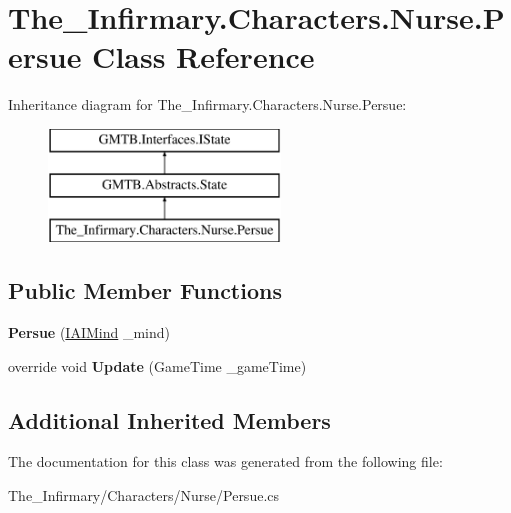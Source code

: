 \hypertarget{class_the___infirmary_1_1_characters_1_1_nurse_1_1_persue}{}\section{The\+\_\+\+Infirmary.\+Characters.\+Nurse.\+Persue Class Reference}
\label{class_the___infirmary_1_1_characters_1_1_nurse_1_1_persue}
Inheritance diagram for The\+\_\+\+Infirmary.\+Characters.\+Nurse.\+Persue\+:\begin{figure}[H]
\begin{center}
\leavevmode
\includegraphics[height=3.000000cm]{class_the___infirmary_1_1_characters_1_1_nurse_1_1_persue}
\end{center}
\end{figure}
\subsection*{Public Member Functions}
\begin{DoxyCompactItemize}
\item 
\mbox{\label{class_the___infirmary_1_1_characters_1_1_nurse_1_1_persue_a999d332e502dbbe8eaf266f3944b85ae}} 
{\bfseries Persue} (\mbox{\hyperlink{interface_g_m_t_b_1_1_interfaces_1_1_i_a_i_mind}{I\+A\+I\+Mind}} \+\_\+mind)
\item 
\mbox{\label{class_the___infirmary_1_1_characters_1_1_nurse_1_1_persue_a6881ee12a2c3ec69e5a9824cc56dcf6a}} 
override void {\bfseries Update} (Game\+Time \+\_\+game\+Time)
\end{DoxyCompactItemize}
\subsection*{Additional Inherited Members}


The documentation for this class was generated from the following file\+:\begin{DoxyCompactItemize}
\item 
The\+\_\+\+Infirmary/\+Characters/\+Nurse/Persue.\+cs\end{DoxyCompactItemize}
